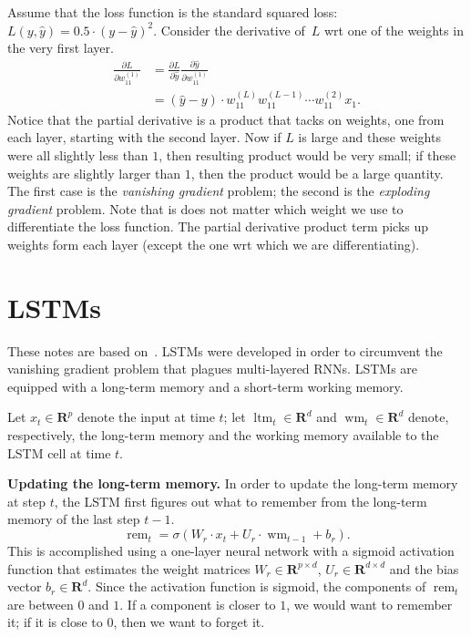 \documentclass[12pt]{article}
\theoremstyle{definition}
\newcommand{\R}{\ensuremath{\bm{R}}}
\DeclareMathOperator{\rem}{rem}
\DeclareMathOperator{\ltm}{ltm}
\DeclareMathOperator{\wm}{wm}
\begin{document}
Assume that the loss function is the standard squared loss: $L(y, \hat{y}) = 0.5 \cdot (y - \hat{y})^2$. 
Consider the derivative of~$L$ wrt one of the weights in the very first layer. 
\begin{align*}
    \frac{\partial L}{\partial w_{11}^{(1)}} & = 
        \frac{\partial L}{\partial \hat{y}}
        \frac{\partial \hat{y}}{\partial w_{11}^{(1)}} \\
        & = (\hat{y} - y) \cdot w_{11}^{(L)} w_{11}^{(L - 1)} \cdots w_{11}^{(2)} x_1. 
\end{align*}
Notice that the partial derivative is a product that tacks on weights, one from each 
layer, starting with the second layer. Now if $L$ is large and these weights were 
all slightly less than $1$, then resulting product would be very small; if these weights 
are slightly larger than $1$, then the product would be a large quantity. The first 
case is the \emph{vanishing gradient} problem; the second is the 
\emph{exploding gradient} problem. Note that is does not matter which 
weight we use to differentiate the loss function. The partial derivative product 
term picks up weights form each layer (except the one wrt which we are differentiating). 
 


\section{LSTMs}
These notes are based on~\cite{EChen}. LSTMs were developed in order to 
circumvent the vanishing gradient problem that 
plagues multi-layered RNNs. LSTMs are equipped with a long-term memory and a 
short-term working memory. 

Let $x_t \in \R^{p}$ denote the input at time $t$; let $\ltm_{t} \in \R^{d}$ 
and $\wm_{t} \in \R^{d}$ denote, respectively, the long-term memory and the 
working memory available to the LSTM cell at time $t$. 

\medskip

\noindent \textbf{Updating the long-term memory.} In order to update the long-term
memory at step $t$, the LSTM first figures out what to remember from the 
long-term memory of the last step $t - 1$. 
\begin{equation}
\rem_{t} = \sigma \left ( W_r \cdot x_t + U_r \cdot \wm_{t - 1} + b_r \right ). 
\end{equation}
This is accomplished using a one-layer neural network with a sigmoid activation 
function that estimates the weight matrices $W_r \in \R^{p \times d}$, 
$U_r \in \R^{d \times d}$ and the bias vector $b_r \in \R^{d}$. Since the 
activation function is sigmoid, the components of $\rem_t$ are between $0$ and 
$1$. If a component is closer to $1$, we would want to remember it; if it is 
close to $0$, then we want to forget it. 
\end{document}
